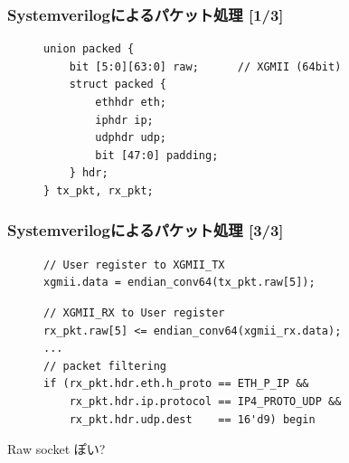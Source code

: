 \documentclass[10pt, compress]{beamer}
\begin{document}
\begin{frame}[fragile,t]
  \frametitle{Systemverilogによるパケット処理 [1/3]}

\begin{figure}
\begin{tcolorbox}[title=user\_app.sv]
\begin{verbatim}
union packed {
    bit [5:0][63:0] raw;      // XGMII (64bit)
    struct packed {
        ethhdr eth;
        iphdr ip;
        udphdr udp;
        bit [47:0] padding;
    } hdr;
} tx_pkt, rx_pkt;
\end{verbatim}
\end{tcolorbox}
\end{figure}

\end{frame}



\begin{frame}[fragile,t]
  \frametitle{Systemverilogによるパケット処理 [3/3]}

\vspace{-1em}

\begin{figure}
\begin{tcolorbox}[title=TX]
\begin{verbatim}
// User register to XGMII_TX
xgmii.data = endian_conv64(tx_pkt.raw[5]);
\end{verbatim}
\end{tcolorbox}
%
\begin{tcolorbox}[title=RX]
\begin{verbatim}
// XGMII_RX to User register
rx_pkt.raw[5] <= endian_conv64(xgmii_rx.data);
...
// packet filtering
if (rx_pkt.hdr.eth.h_proto == ETH_P_IP &&
    rx_pkt.hdr.ip.protocol == IP4_PROTO_UDP &&
    rx_pkt.hdr.udp.dest    == 16'd9) begin
\end{verbatim}
\end{tcolorbox}
\end{figure}

\vspace{-.5em}
Raw socket ぽい?
\end{frame}


\end{document}
